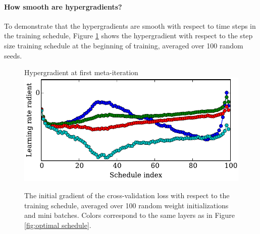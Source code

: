 \documentclass{article}
\begin{document}
\paragraph{How smooth are hypergradients?}
To demonstrate that the hypergradients are smooth with respect to time steps in the training schedule, Figure \ref{fig:smoothed gradient} shows the hypergradient with respect to the step size training schedule at the beginning of training, averaged over 100 random seeds.
%
\begin{figure}[h!]
\vskip 0.1in
\begin{center}
Hypergradient at first meta-iteration\\
\includegraphics[width=\columnwidth]{../experiments/Feb_3_training_schedules/5_initial_gradient/schedules_small.pdf}
\vskip -0.1in
\caption{The initial gradient of the cross-validation loss with respect to the training schedule, averaged over 100 random weight initializations and mini batches.
Colors correspond to the same layers as in Figure \ref{fig:optimal schedule}.}
\label{fig:smoothed gradient}
\end{center}
\vskip -0.2in
\end{figure} 
%
\end{document}
